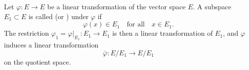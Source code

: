 Let $\varphi: E \to E$ be a linear transformation of the vector space $E$. A subspace $E_1 \subset E$ is called  (or ) under $\varphi$ if
$$
\varphi(x) \in E_1 \quad \text{for all} \quad x \in E_1.
$$
The restriction $\varphi_1 = \varphi|_{E_1}: E_1 \to E_1$ is then a linear transformation of $E_1$, and $\varphi$ induces a linear transformation
$$
\bar{\varphi}: E/E_1 \to E/E_1
$$
on the quotient space.
